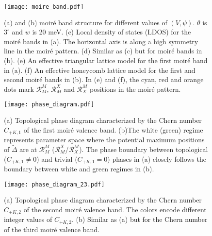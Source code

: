 \documentclass[aps,prx,floatfix,twocolumn]{revtex4-1}
\begin{document}
	
    \begin{figure}[t!]
		\centering
		\texttt{[image: moire\_band.pdf]}
		\caption{(a) and (b) moir\'e band structure for different values of $(V, \psi)$. $\theta$ is $3^{\circ}$ and $w$ is 20 meV. (c) Local density of states (LDOS) for the moir\'e bands in (a). The horizontal axis is along a high symmetry line in the moir\'e pattern. (d) Similar as (c) but for moir\'e bands in (b). (e) An effective triangular lattice model for the first moir\'e band in (a). (f) An effective honeycomb lattice model for the first and second moir\'e bands in (b). In (e) and (f), the cyan, red and orange dots mark $\mathcal{R}_{M}^{M}$, $\mathcal{R}_{M}^{X}$ and $\mathcal{R}_{X}^{M}$ positions in the moir\'e pattern.}	
		\label{fig:moire_band}
    \end{figure}		
    
        \begin{figure}[t]
		\centering
		\texttt{[image: phase\_diagram.pdf]}
		\caption{(a) Topological phase diagram characterized by the Chern number $C_{+K,1}$ of the first moir\'e valence band. (b)The white (green) regime represents parameter space where the potential maximum positions of $\tilde{\Delta}$ are at $\mathcal{R}_M^M$ ($\mathcal{R}_M^X$/$\mathcal{R}_X^M$). The phase boundary between topological ($C_{+K,1} \neq 0$) and trivial ($C_{+K,1} = 0$) phases in (a) closely follows the boundary between white and green regimes in (b).  }	
		\label{fig:phase_diagram}
    \end{figure}

    \begin{figure}[t]
		\centering
		\texttt{[image: phase\_diagram\_23.pdf]}
		\caption{(a) Topological phase diagram characterized by the Chern number $C_{+K,2}$ of the second moir\'e valence band. The colors encode different integer values of $C_{+K,2}$. (b) Similar as (a) but for the Chern number of the third moir\'e valence band.  }	
		\label{fig:phase_diagram_23}
    \end{figure}
	
\end{document}
